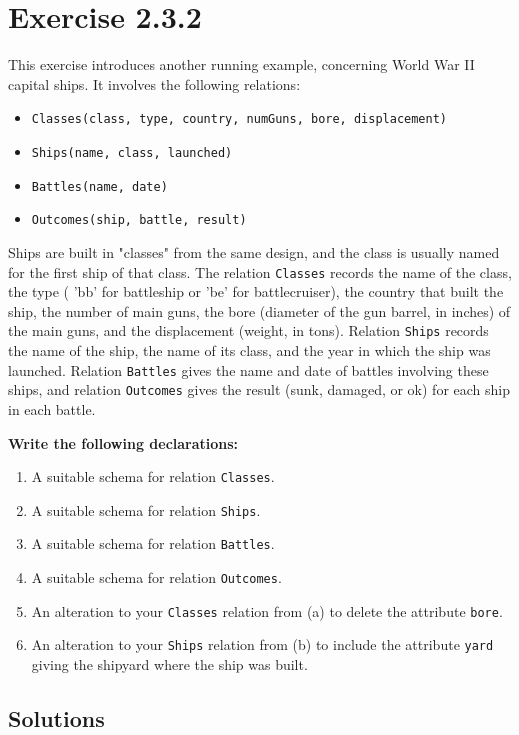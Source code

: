 \documentclass{cshwk}
\begin{document}
\section{Exercise 2.3.2}
This exercise introduces another running example, concerning World War II capital ships. It involves the following relations:
\begin{itemize}
    \item \texttt{Classes(class, type, country, numGuns, bore, displacement)}
    \item \texttt{Ships(name, class, launched)}
    \item \texttt{Battles(name, date)}
    \item \texttt{Outcomes(ship, battle, result)}
\end{itemize}
Ships are built in "classes" from the same design, and the class is usually named for the first ship of that class. The relation \texttt{Classes} records the name of the class, the type ( 'bb' for battleship or 'be' for battlecruiser), the country that built the ship, the number of main guns, the bore (diameter of the gun barrel, in inches) of the main guns, and the displacement (weight, in tons). Relation \texttt{Ships} records the name of the ship, the name of its class, and the year in which the ship was launched. Relation \texttt{Battles} gives the name and date of battles involving these ships, and relation \texttt{Outcomes} gives the result (sunk, damaged, or ok) for each ship in each battle.

\textbf{Write the following declarations:}
\begin{enumerate}
    \item A suitable schema for relation \texttt{Classes}.
    \item A suitable schema for relation \texttt{Ships}.
    \item A suitable schema for relation \texttt{Battles}.
    \item A suitable schema for relation \texttt{Outcomes}.
    \item An alteration to your \texttt{Classes} relation from (a) to delete the attribute \texttt{bore}.
    \item An alteration to your \texttt{Ships} relation from (b) to include the attribute \texttt{yard} giving the shipyard where the ship was built.
\end{enumerate}

\subsection*{Solutions}
\end{document}
